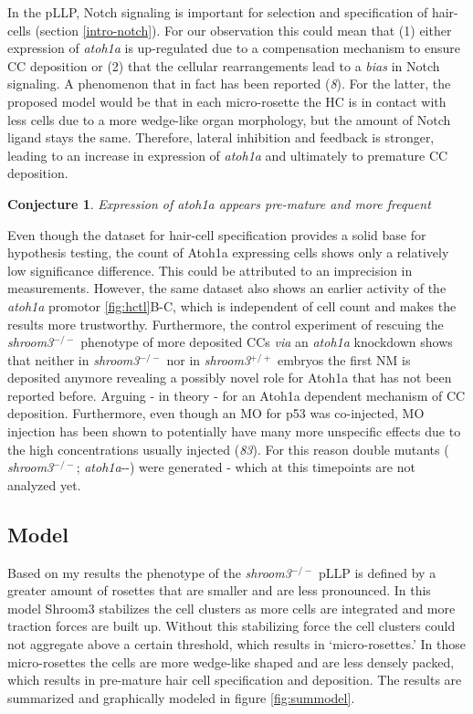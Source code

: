 \documentclass[10pt, b5paper, singlespacinge, twoside]{reedthesis} %
\newtheorem{conjecture}{Conjecture}[chapter]
\theoremstyle{definition}
\theoremstyle{definition}
\theoremstyle{definition}
\theoremstyle{remark}
\begin{document}
In the pLLP, Notch signaling is important for selection and specification of hair-cells (section \ref{intro-notch}). For our observation this could mean that (1) either expression of \emph{atoh1a} is up-regulated due to a compensation mechanism to ensure CC deposition or (2) that the cellular rearrangements lead to a \emph{bias} in Notch signaling. A phenomenon that in fact has been reported (\emph{8}). For the latter, the proposed model would be that in each micro-rosette the HC is in contact with less cells due to a more wedge-like organ morphology, but the amount of Notch ligand stays the same. Therefore, lateral inhibition and feedback is stronger, leading to an increase in expression of \emph{atoh1a} and ultimately to premature CC deposition.
\begin{conjecture}
\protect\hypertarget{cnj:unnamed-chunk-17}{}{\label{cnj:unnamed-chunk-17} }Expression of atoh1a appears pre-mature and more frequent
\end{conjecture}
Even though the dataset for hair-cell specification provides a solid base for hypothesis testing, the count of Atoh1a expressing cells shows only a relatively low significance difference. This could be attributed to an imprecision in measurements. However, the same dataset also shows an earlier activity of the \emph{atoh1a} promotor \ref{fig:hctl}B-C, which is independent of cell count and makes the results more trustworthy. Furthermore, the control experiment of rescuing the \emph{shroom3}\(^{-/-}\) phenotype of more deposited CCs \emph{via} an \emph{atoh1a} knockdown shows that neither in \emph{shroom3}\(^{-/-}\) nor in \emph{shroom3}\(^{+/+}\) embryos the first NM is deposited anymore revealing a possibly novel role for Atoh1a that has not been reported before. Arguing - in theory - for an Atoh1a dependent mechanism of CC deposition. Furthermore, even though an MO for p53 was co-injected, MO injection has been shown to potentially have many more unspecific effects due to the high concentrations usually injected (\emph{83}). For this reason double mutants ( \emph{shroom3}\(^{-/-}\); \emph{atoh1a}-\/-) were generated - which at this timepoints are not analyzed yet.

\hypertarget{model-2}{%
\subsection{Model}\label{model-2}}

Based on my results the phenotype of the \emph{shroom3}\(^{-/-}\) pLLP is defined by a greater amount of rosettes that are smaller and are less pronounced. In this model Shroom3 stabilizes the cell clusters as more cells are integrated and more traction forces are built up. Without this stabilizing force the cell clusters could not aggregate above a certain threshold, which results in `micro-rosettes.' In those micro-rosettes the cells are more wedge-like shaped and are less densely packed, which results in pre-mature hair cell specification and deposition. The results are summarized and graphically modeled in figure \ref{fig:summodel}.
\end{document}
